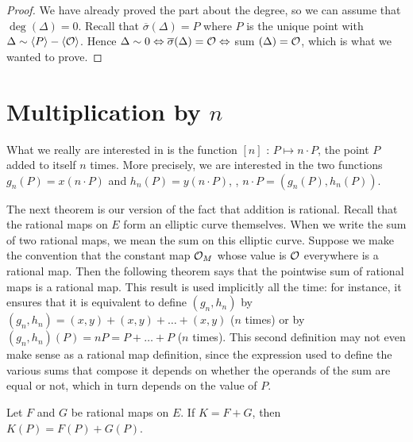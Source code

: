 \begin{proof}
We have already proved the part about the degree, so we can assume that $\deg(\Delta)=0$. Recall that $\overline{\sigma}(\Delta)=P$ where $P$ is the unique point with $\Delta\sim\left\langle P \right \rangle-\left\langle \mathcal{O} \right \rangle$. Hence $\Delta\sim 0\Leftrightarrow\overline{\sigma}(\Delta)=\mathcal{O}\Leftrightarrow$ sum $(\Delta)=\mathcal{O}$, which is what we wanted to prove.
\end{proof}

\section{Multiplication by $n$}

What we really are interested in is the function $[n]$ : $P\mapsto n\cdot P$, the point $P$ added to itself $n$ times. More precisely, we are interested in the two functions $g_{n}(P)=x(n\cdot P)$ and $h_{n}(P)=y(n\cdot P)$, \ie, $n\cdot P=(g_{n}(P),h_{n}(P))$.

The next theorem is our version of the fact that addition is rational. Recall that the rational maps on $E$ form an elliptic curve themselves. When we write the sum of two rational maps, we mean the sum on this elliptic curve. Suppose we make the convention that the constant map $\mathcal{O}_{M}$ whose value is $\mathcal{O}$ everywhere is a rational map. Then the following theorem says that the pointwise sum of rational maps is a rational map. This result is used implicitly all the time: for instance, it ensures that it is equivalent to define $(g_n, h_n)$ by $(g_n, h_n)=(x,y)+(x,y)+\ldots+(x,y)$ ($n$ times) or by $(g_n, h_n)(P)=n P = P+\ldots+P$ ($n$ times). This second definition may not even make sense as a rational map definition, since the expression used to define the various sums that compose it depends on whether the operands of the sum are equal or not, which in turn depends on the value of $P$.

\begin{theo}
\label{t7.1}
Let $F$ and $G$ be rational maps on $E$. If $K=F+G$, then $K(P)= F(P)+G(P)$.
\end{theo}


